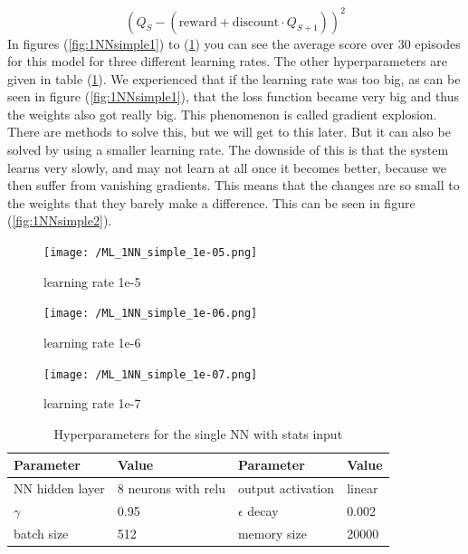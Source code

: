 \documentclass{report}
\begin{document}
\begin{equation}
    \label{eq:loss1}
    \left( Q_{S} - \left(\text{reward} + \text{discount}\cdot Q_{S+1} \right) \right)^2
\end{equation}
In figures (\ref{fig:1NNsimple1}) to (\ref{fig:1NNsimple3}) you can see the average score over 30 episodes for this model for three different learning rates. The other hyperparameters are given in table (\ref{tab:1NN_simple}). We experienced that if the learning rate was too big, as can be seen in figure (\ref{fig:1NNsimple1}), that the loss function became very big and thus the weights also got really big. This phenomenon is called gradient explosion. There are methods to solve this, but we will get to this later. But it can also be solved by using a smaller learning rate. The downside of this is that the system learns very slowly, and may not learn at all once it becomes better, because we then suffer from vanishing gradients. This means that the changes are so small to the weights that they barely make a difference. This can be seen in figure (\ref{fig:1NNsimple2}).
\begin{figure}[h]
	\centering
	\begin{minipage}[b]{0.32\textwidth}
   		\texttt{[image: /ML\_1NN\_simple\_1e-05.png]}
    	\caption{learning rate 1e-5}
    	\label{fig:1NNsimple1}
 	\end{minipage}
  	\begin{minipage}[b]{0.32\textwidth}
    	\texttt{[image: /ML\_1NN\_simple\_1e-06.png]}
    	\caption{learning rate 1e-6}
    	\label{fig:1NNsimple2}
 	\end{minipage}
 	\begin{minipage}[b]{0.32\textwidth}
    	\texttt{[image: /ML\_1NN\_simple\_1e-07.png]}
    	\caption{learning rate 1e-7}
    	\label{fig:1NNsimple3}
 	\end{minipage}
\end{figure}

\begin{table}[]
    \centering
    \begin{tabular}{|l|l||l|l|}
        \hline
        Parameter & Value & Parameter & Value \\ \hline
        NN hidden layer &  8 neurons with relu & output activation & linear \\
        $\gamma$ & 0.95 & $\epsilon$ decay & 0.002 \\
        batch size & 512 & memory size & 20000 \\
        \hline
    \end{tabular}
    \caption{Hyperparameters for the single NN with stats input}
    \label{tab:1NN_simple}
\end{table}
\end{document}
